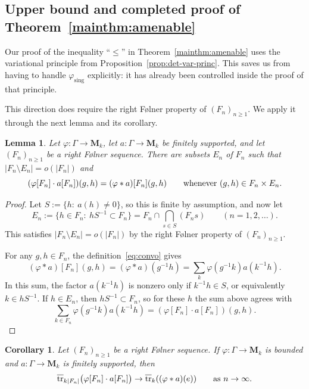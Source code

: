 \documentclass[12pt,a4paper]{article}
\numberwithin{equation}{section}
\newtheorem{lem}[thm]{Lemma}
\newtheorem{cor}[thm]{Corollary}
\theoremstyle{remark}
\renewcommand{\rm}[1]{\mathrm{#1}}
\newcommand{\rmM}{\mathbf{M}}
\newcommand{\G}{\Gamma}
\renewcommand{\phi}{\varphi}
\newcommand{\tr}{\overline{\mathrm{tr}}}
\begin{document}
\subsection{Upper bound and completed proof of Theorem~\ref{mainthm:amenable}}\label{subs:amen-UB}

Our proof of the inequality ``$\le$'' in Theorem~\ref{mainthm:amenable} uses the variational principle from Proposition~\ref{prop:det-var-princ}.  This saves us from having to handle $\phi_{\rm{sing}}$ explicitly: it has already been controlled inside the proof of that principle.

This direction does require the right F\o lner property of $(F_n)_{n \ge 1}$.  We apply it through the next lemma and its corollary.

\begin{lem}\label{lem:phiFnAn}
Let $\phi:\G\to\rmM_k$, let $a:\G\to\rmM_k$ be finitely supported, and let $(F_n)_{n \ge 1}$ be a right F\o lner sequence.  There are subsets $E_n$ of $F_n$ such that $|F_n\setminus E_n| = o(|F_n|)$ and
\[(\phi[F_n]\cdot a[F_n])(g,h) = (\phi\ast a)[F_n](g,h) \qquad \hbox{whenever}\ (g,h) \in F_n \times E_n.\]
\end{lem}

\begin{proof}
Let $S := \{h:\ a(h) \ne 0\}$, so this is finite by assumption, and now let
\[E_n := \{h \in F_n:\ hS^{-1} \subset F_n\} = F_n\cap\bigcap_{s \in S}(F_ns) \qquad (n=1,2,\dots).\]
This satisfies $|F_n\setminus E_n| = o(|F_n|)$ by the right F\o lner property of $(F_n)_{n\ge 1}$.

For any $g,h \in F_n$, the definition~\eqref{eq:convo} gives
\[(\phi\ast a)[F_n](g,h) = (\phi\ast a)(g^{-1}h) = \sum_k \phi(g^{-1}k)a(k^{-1}h).\]
In this sum, the factor $a(k^{-1}h)$ is nonzero only if $k^{-1}h \in S$, or equivalently $k \in hS^{-1}$.  If $h \in E_n$, then $hS^{-1} \subset F_n$, so for these $h$ the sum above agrees with
\[\sum_{k\in F_n} \phi(g^{-1}k)a(k^{-1}h) = (\phi[F_n]\cdot a[F_n])(g,h).\]
\end{proof}

\begin{cor}\label{cor:phiFnAn}
Let $(F_n)_{n\ge 1}$ be a right F\o lner sequence.  If $\phi:\G\to \rmM_k$ is bounded and $a:\G\to\rmM_k$ is finitely supported, then
\[\tr_{k|F_n|}\big(\phi[F_n]\cdot a[F_n]\big) \to \tr_k((\phi\ast a)(e)) \qquad \hbox{as}\ n\to\infty.\]
\end{cor}
\end{document}
